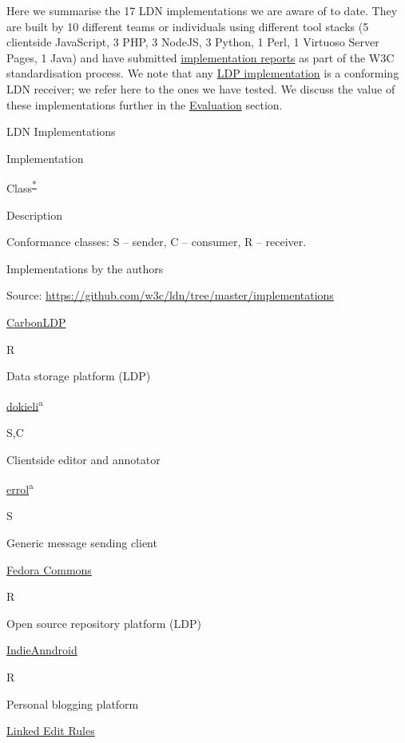 \documentclass[]{article}
\providecommand{\tightlist}{%
  \setlength{\itemsep}{0pt}\setlength{\parskip}{0pt}}
\begin{document}
Here we summarise the 17 LDN implementations we are aware of to date.
They are built by 10 different teams or individuals using different tool
stacks (5 clientside JavaScript, 3 PHP, 3 NodeJS, 3 Python, 1 Perl, 1
Virtuoso Server Pages, 1 Java) and have submitted
\href{https://github.com/w3c/ldn/tree/master/implementations}{implementation
reports} as part of the W3C standardisation process. We note that any
\href{https://www.w3.org/wiki/LDP_Implementations}{LDP implementation}
is a conforming LDN receiver; we refer here to the ones we have tested.
We discuss the value of these implementations further in the
\protect\hyperlink{analysis-and-evaluation}{Evaluation} section.

LDN Implementations

Implementation

Class\textsuperscript{\protect\hyperlink{implementations-key}{*}}

Description

\begin{description}
\tightlist
\item[\textsuperscript{*}]
Conformance classes: S -- sender, C -- consumer, R -- receiver.
\item[\textsuperscript{a}]
Implementations by the authors
\end{description}

Source: \url{https://github.com/w3c/ldn/tree/master/implementations}

\href{https://carbonldp.com}{CarbonLDP}

R

Data storage platform (LDP)

\href{https://dokie.li/}{dokieli}\textsuperscript{a}

S,C

Clientside editor and annotator

\href{https://github.com/linkeddata/errol}{errol}\textsuperscript{a}

S

Generic message sending client

\href{http://fedora-commons.org/}{Fedora Commons}

R

Open source repository platform (LDP)

\href{https://github.com/Kongaloosh/IndieAnndroid}{IndieAnndroid}

R

Personal blogging platform

\href{https://github.com/albertmeronyo/linked-edit-rules}{Linked Edit
Rules}
\end{document}
